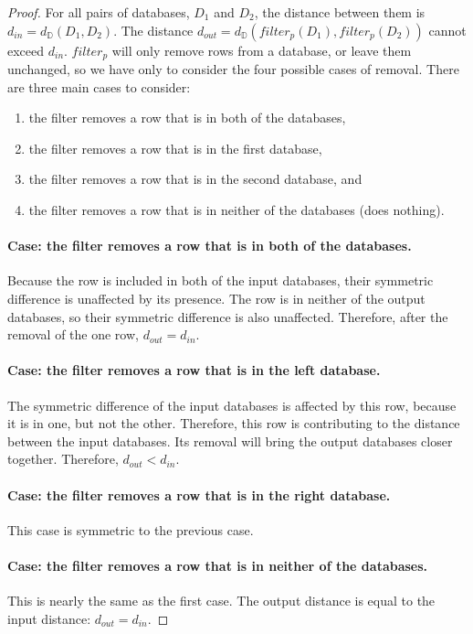 \documentclass[12pt]{report}
\begin{document}
\begin{proof}
For all pairs of databases, $D_1$ and $D_2$, the distance between them is $d_{in} = d_{\mathbb D}(D_1,D_2)$.
The distance $d_{out} = d_{\mathbb D}(filter_p(D_1),filter_p(D_2))$ cannot exceed $d_{in}$.
$filter_p$ will only remove rows from a database, or leave them unchanged, so we have only to consider the four possible cases of removal.
There are three main cases to consider:
\begin{enumerate}
  \item the filter removes a row that is in both of the databases,
  \item the filter removes a row that is in the first database,
  \item the filter removes a row that is in the second database, and
  \item the filter removes a row that is in neither of the databases (does nothing).
\end{enumerate}

\paragraph{Case: the filter removes a row that is in both of the databases.}
Because the row is included in both of the input databases, their symmetric difference is unaffected by its presence.
The row is in neither of the output databases, so their symmetric difference is also unaffected.
Therefore, after the removal of the one row, $d_{out} = d_{in}$.

\paragraph{Case: the filter removes a row that is in the left database.}
The symmetric difference of the input databases is affected by this row, because it is in one, but not the other.
Therefore, this row is contributing to the distance between the input databases.
Its removal will bring the output databases closer together.
Therefore, $d_{out} < d_{in}$.

\paragraph{Case: the filter removes a row that is in the right database.}
This case is symmetric to the previous case.

\paragraph{Case: the filter removes a row that is in neither of the databases.}
This is nearly the same as the first case.
The output distance is equal to the input distance: $d_{out} = d_{in}$.


\end{proof}
\end{document}
